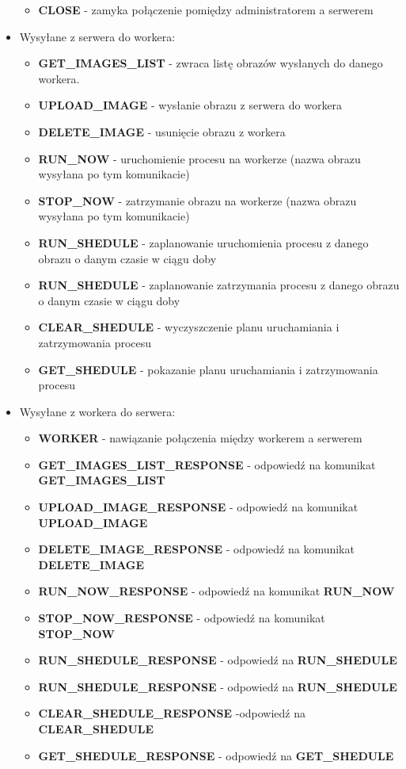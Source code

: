 \documentclass[paper=a4, fontsize=11pt]{scrartcl} %
\begin{document}
\begin{itemize}
\begin{itemize}
    \item \textbf{CLOSE} - zamyka połączenie pomiędzy administratorem a serwerem
    \end{itemize}    
\item Wysyłane z serwera do workera:
  \begin{itemize}
  \item \textbf{GET\_IMAGES\_LIST} - zwraca listę obrazów wysłanych do danego workera.
  \item \textbf{UPLOAD\_IMAGE} - wysłanie obrazu z serwera do workera
  \item \textbf{DELETE\_IMAGE} - usunięcie obrazu z workera
  \item \textbf{RUN\_NOW} - uruchomienie procesu na workerze (nazwa obrazu wysyłana po tym komunikacie)
  \item \textbf{STOP\_NOW} - zatrzymanie obrazu na workerze (nazwa obrazu wysyłana po tym komunikacie)
  \item \textbf{RUN\_SHEDULE} - zaplanowanie uruchomienia procesu z danego obrazu o danym czasie w ciągu doby
  \item \textbf{RUN\_SHEDULE} - zaplanowanie zatrzymania procesu z danego obrazu o danym czasie w ciągu doby
  \item \textbf{CLEAR\_SHEDULE} - wyczyszczenie planu uruchamiania i zatrzymowania procesu
  \item \textbf{GET\_SHEDULE} - pokazanie planu uruchamiania i zatrzymowania procesu
\end{itemize}
\item Wysyłane z workera do serwera:
	\begin{itemize}
	\item \textbf{WORKER} - nawiązanie połączenia między workerem a serwerem
    \item \textbf{GET\_IMAGES\_LIST\_RESPONSE} - odpowiedź na komunikat \textbf{GET\_IMAGES\_LIST}
    \item \textbf{UPLOAD\_IMAGE\_RESPONSE} - odpowiedź na komunikat \textbf{UPLOAD\_IMAGE}
    \item \textbf{DELETE\_IMAGE\_RESPONSE} - odpowiedź na komunikat \textbf{DELETE\_IMAGE}
    \item \textbf{RUN\_NOW\_RESPONSE} - odpowiedź na komunikat \textbf{RUN\_NOW}
    \item \textbf{STOP\_NOW\_RESPONSE} - odpowiedź na komunikat \textbf{STOP\_NOW}
    \item \textbf{RUN\_SHEDULE\_RESPONSE} - odpowiedź na \textbf{RUN\_SHEDULE}
	\item \textbf{RUN\_SHEDULE\_RESPONSE} - odpowiedź na \textbf{RUN\_SHEDULE}
	\item \textbf{CLEAR\_SHEDULE\_RESPONSE} -odpowiedź na \textbf{CLEAR\_SHEDULE}
	\item \textbf{GET\_SHEDULE\_RESPONSE} - odpowiedź na \textbf{GET\_SHEDULE}
  	\end{itemize}
\end{itemize}
\end{document}
